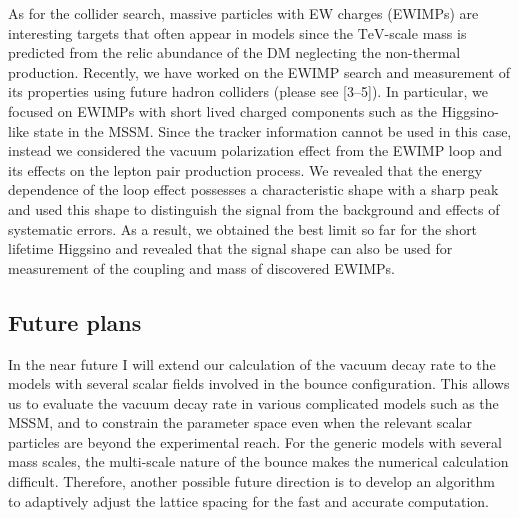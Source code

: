 \documentclass[12pt,notitlepage]{book}
\def\rem#1{ {\bf\textcolor{red}{($\clubsuit$ #1 $\clubsuit$)}}}
\begin{document}
As for the collider search, massive particles with EW charges (EWIMPs) are interesting targets that often appear in models since the $\mathrm{TeV}$-scale mass is predicted from the relic abundance of the DM neglecting the non-thermal production.
Recently, we have worked on the EWIMP search and measurement of its properties using future hadron colliders (please see [3--5]).
In particular, we focused on EWIMPs with short lived charged components such as the Higgsino-like state in the MSSM.
Since the tracker information cannot be used in this case, instead we considered the vacuum polarization effect from the EWIMP loop and its effects on the lepton pair production process.
We revealed that the energy dependence of the loop effect possesses a characteristic shape with a sharp peak and used this shape to distinguish the signal from the background and effects of systematic errors.
As a result, we obtained the best limit so far for the short lifetime Higgsino and revealed that the signal shape can also be used for measurement of the coupling and mass of discovered EWIMPs.





\vspace*{-2mm}
\subsection*{Future plans}

In the near future I will extend our calculation of the vacuum decay
rate to the models with several scalar fields involved in the bounce
configuration.  This allows us to evaluate the vacuum decay rate in
various complicated models such as the MSSM, and to constrain the
parameter space even when the relevant scalar particles are beyond the
experimental reach.  For the generic models with several mass scales,
the multi-scale nature of the bounce makes the numerical calculation
difficult.  Therefore, another possible future direction is to develop
an algorithm to adaptively adjust the lattice spacing for the fast and
accurate computation.
\end{document}
